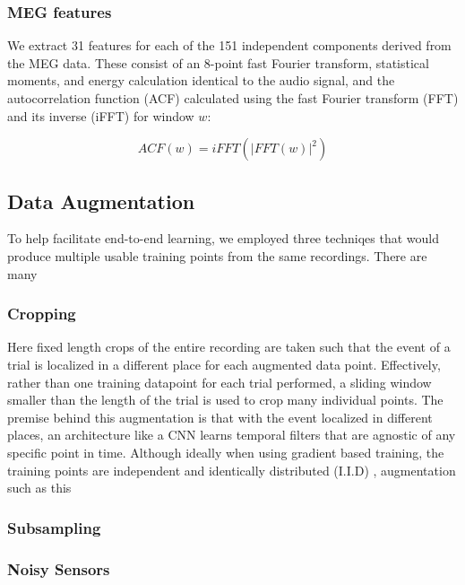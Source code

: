 \documentclass[utf8]{frontiersSCNS} %
\begin{document}
\subsubsection{MEG features}

We extract 31 features for each of the 151 independent components derived from the MEG data. These consist of an 8-point fast Fourier transform, statistical moments, and energy calculation identical to the audio signal, and the autocorrelation function (ACF) calculated using the fast Fourier transform (FFT) and its inverse (iFFT) for window $w$:


\begin{equation}
  ACF(w) = iFFT(|FFT(w)|^2)
  \label{eq1}
\end{equation}

\subsection{Data Augmentation}

To help facilitate end-to-end learning, we employed three techniqes that would produce multiple usable training points from the same recordings. There are many 

\subsubsection{Cropping}

Here fixed length crops of the entire recording are taken such that the event of a trial is localized in a different place for each augmented data point. Effectively, rather than one training datapoint for each trial performed, a sliding window smaller than the length of the trial is used to crop many individual points. The premise behind this augmentation is that with the event localized in different places, an architecture like a CNN learns temporal filters that are agnostic of any specific point in time. Although ideally when using gradient based training, the training points are independent and identically distributed (I.I.D) \cite{}, augmentation such as this 

\subsubsection{Subsampling}

\subsubsection{Noisy Sensors}
\end{document}
